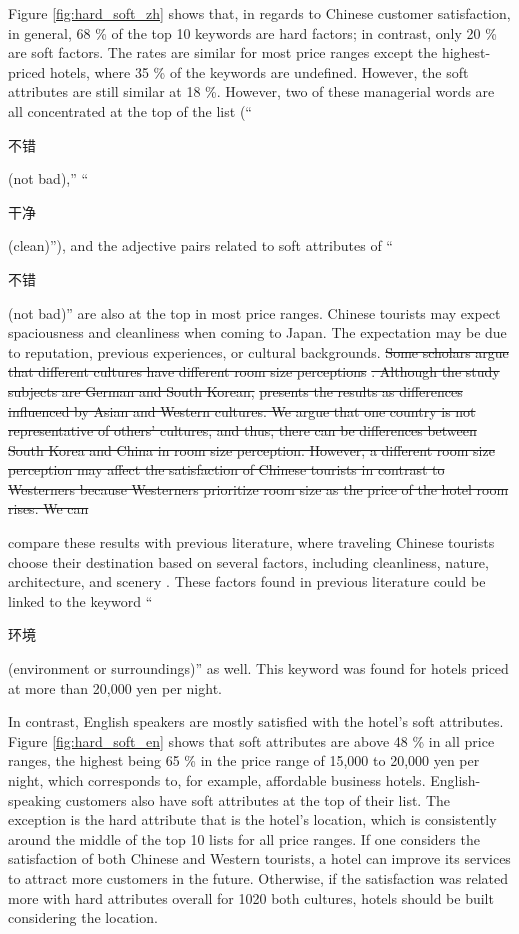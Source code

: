 \documentclass[smallextended,natbib]{svjour3}       %
\providecommand{\DIFadd}[1]{{\protect\color{blue}\uwave{#1}}} %
\providecommand{\DIFdel}[1]{{\protect\color{red}\sout{#1}}}                      %
\providecommand{\DIFaddbegin}{} %
\providecommand{\DIFaddend}{} %
\providecommand{\DIFdelbegin}{} %
\providecommand{\DIFdelend}{} %
\newcommand{\DIFscaledelfig}{0.5}
\newlength{\DIFdelgraphicswidth} %
\newlength{\DIFdelgraphicsheight} %
\newcommand{\DIFaddincludegraphics}[2][]{{\color{blue}\fbox{\DIFOincludegraphics[#1]{#2}}}} %
\newcommand{\DIFdelincludegraphics}[2][]{%
\sbox{\DIFdelgraphicsbox}{\DIFOincludegraphics[#1]{#2}}%
\settoboxwidth{\DIFdelgraphicswidth}{\DIFdelgraphicsbox} %
\settoboxtotalheight{\DIFdelgraphicsheight}{\DIFdelgraphicsbox} %
\scalebox{\DIFscaledelfig}{%
\parbox[b]{\DIFdelgraphicswidth}{\usebox{\DIFdelgraphicsbox}\\[-\baselineskip] \rule{\DIFdelgraphicswidth}{0em}}\llap{\resizebox{\DIFdelgraphicswidth}{\DIFdelgraphicsheight}{%
\setlength{\unitlength}{\DIFdelgraphicswidth}%
\begin{picture}(1,1)%
\thicklines\linethickness{2pt} %
{\color[rgb]{1,0,0}\put(0,0){\framebox(1,1){}}}%
{\color[rgb]{1,0,0}\put(0,0){\line( 1,1){1}}}%
{\color[rgb]{1,0,0}\put(0,1){\line(1,-1){1}}}%
\end{picture}%
}\hspace*{3pt}}} %
} %
\DeclareRobustCommand{\DIFaddbegin}{\DIFOaddbegin \let\includegraphics\DIFaddincludegraphics} %
\DeclareRobustCommand{\DIFaddend}{\DIFOaddend \let\includegraphics\DIFOincludegraphics} %
\DeclareRobustCommand{\DIFdelbegin}{\DIFOdelbegin \let\includegraphics\DIFdelincludegraphics} %
\DeclareRobustCommand{\DIFdelend}{\DIFOaddend \let\includegraphics\DIFOincludegraphics} %
\begin{document}
    Figure \ref{fig:hard_soft_zh} shows that, in regards to Chinese customer satisfaction, in general, 68 \% of the top 10 keywords are hard factors; in contrast, only 20 \% are soft factors. The rates are similar for most price ranges except the highest-priced hotels, where 35 \% of the keywords are undefined. However, the soft attributes are still similar at 18 \%. However, two of these managerial words are all concentrated at the top of the list (``\begin{CJK}{UTF8}{gbsn}不错\end{CJK} (not bad),'' ``\begin{CJK}{UTF8}{gbsn}干净\end{CJK} (clean)''), and the adjective pairs related to soft attributes of ``\begin{CJK}{UTF8}{gbsn}不错\end{CJK} (not bad)'' are also at the top in most price ranges. Chinese tourists may expect spaciousness and cleanliness when coming to Japan. The expectation may be due to reputation, previous experiences, or cultural backgrounds.
\DIFdelbegin \DIFdel{Some scholars argue that different cultures have different room size perceptions }%
\DIFdel{. Although the study subjects are German and South Korean, }%
\DIFdel{presents the results as differences influenced by Asian and Western cultures. We argue that one country is not representative of others’ cultures, and thus, there can be differences between South Korea and China in room size perception. However, a different room size perception may affect the satisfaction of Chinese tourists in contrast to Westerners because Westerners prioritize room size as the price of the hotel room rises. We can }\DIFdelend \DIFaddbegin 

    \DIFadd{We can }\DIFaddend compare these results with previous literature, where traveling Chinese tourists choose their destination based on several factors, including cleanliness, nature, architecture, and scenery \cite[][]{ryan2001}. These factors found in previous literature could be linked to the keyword ``\begin{CJK}{UTF8}{gbsn}环境\end{CJK} (environment or surroundings)'' as well. This keyword was found for hotels priced at more than 20,000 yen per night. 

    In contrast, English speakers are mostly satisfied with the hotel's soft attributes. Figure \ref{fig:hard_soft_en} shows that soft attributes are above 48 \% in all price ranges, the highest being 65 \% in the price range of 15,000 to 20,000 yen per night, which corresponds to, for example, affordable business hotels. English-speaking customers also have soft attributes at the top of their list. The exception is the hard attribute that is the hotel's location, which is consistently around the middle of the top 10 lists for all price ranges. If one considers the satisfaction of both Chinese and Western tourists, a hotel can improve its services to attract more customers in the future. Otherwise, if the satisfaction was related more with hard attributes overall for 1020 both cultures, hotels should be built considering the location.
\end{document}
